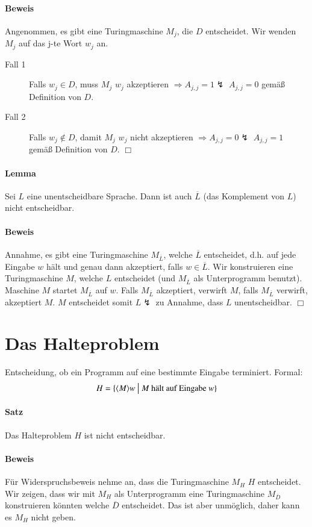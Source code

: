 \paragraph*{Beweis} Angenommen, es gibt eine Turingmaschine $M_j$, die $D$ entscheidet. Wir wenden $M_j$ auf das j-te Wort $w_j$ an.
\begin{description}
	\item[Fall 1] Falls $w_j \in D$, muss $M_j$ $w_j$ akzeptieren $\Rightarrow A_{j,j}=1 \lightning$ $A_{j,j}=0$ gemäß Definition von $D$.
	\item[Fall 2] Falls $w_j \not\in D$, damit $M_j$ $w_j$ nicht akzeptieren $\Rightarrow A_{j,j}=0 \lightning$ $A_{j,j}=1$ gemäß Definition von $D$. $\Box$
\end{description}

\paragraph*{Lemma} Sei $L$ eine unentscheidbare Sprache. Dann ist auch $\overline{L}$ (das Komplement von $L$) nicht entscheidbar.

\paragraph*{Beweis} Annahme, es gibt eine Turingmaschine $M_{\overline{L}}$, welche $\overline{L}$ entscheidet, d.h. auf jede Eingabe $w$ hält und genau dann akzeptiert, falls $w \in \overline{L}$. Wir konstruieren eine Turingmaschine $M$, welche $L$ entscheidet (und $M_{\overline{L}}$ als Unterprogramm benutzt). Maschine $M$ startet $M_{\overline{L}}$ auf $w$. Falls $M_{\overline{L}}$ akzeptiert, verwirft $M$, falls $M_{\overline{L}}$ verwirft, akzeptiert $M$. $M$ entscheidet somit $L \lightning$ zu Annahme, dass $L$ unentscheidbar. $\Box$


\section{Das Halteproblem}
Entscheidung, ob ein Programm auf eine bestimmte Eingabe terminiert. Formal: $$ H=\{\langle M \rangle w \ \big|\  M \text{ hält auf Eingabe } w \} $$

\paragraph*{Satz} Das Halteproblem $H$ ist nicht entscheidbar.

\paragraph*{Beweis} Für Widerspruchsbeweis nehme an, dass die Turingmaschine $M_H$ $H$ entscheidet. Wir zeigen, dass wir mit $M_H$ als Unterprogramm eine Turingmaschine $M_{\overline{D}}$ konstruieren könnten welche $\overline{D}$ entscheidet. Das ist aber unmöglich, daher kann es $M_H$ nicht geben.

